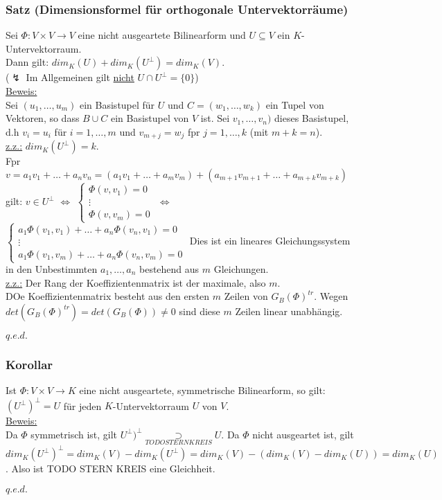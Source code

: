 \documentclass[a4paper]{article}
\newcommand{\ul}{\underline}
\renewcommand{\proof}{\ul{Beweis:}\\}
\renewcommand{\qed}{\begin{flushright}
\ul{\(q.e.d.\)}
\end{flushright}}
\begin{document}
\subsubsection{Satz (Dimensionsformel für orthogonale Untervektorräume)}
Sei \(\Phi:V\times V\rightarrow V\) eine nicht ausgeartete Bilinearform und \(U\subseteq V\) ein \(K\)-Untervektorraum.\\
Dann gilt: \(dim_K(U)+dim_K(U^\bot)=dim_K(V)\).\\
(\(\lightning\) Im Allgemeinen gilt \ul{nicht} \(U\cap U^\bot=\{0\}\))\\
\proof
Sei \((u_1,\dots, u_m)\) ein Basistupel für \(U\) und \(C=(w_1,\dots,w_k)\) ein Tupel von Vektoren, so dass \(B\cup C\) ein Basistupel von \(V\) ist. Sei \(v_1,\dots,v_n)\) dieses Basistupel, d.h \(v_i=u_i\) für \(i=1,\dots,m\) und \(v_{m+j}=w_j\) fpr \(j=1,\dots,k\) (mit \(m+k=n\)).\\
\ul{z.z.:} \(dim_K(U^\bot)=k\).\\
Fpr \(v=a_1v_1+\dots+a_nv_n=(a_1v_1+\dots+a_mv_m)+(a_{m+1}v_{m+1}+\dots+a_{m+k}v_{m+k})\) gilt: \(v\in U^\bot\) \(\Leftrightarrow\) \(\begin{cases}
	\Phi(v,v_1)=0\\
	\vdots\\
	\Phi(v,v_m)=0
	\end{cases}\) \(\Leftrightarrow\) \(\begin{cases}
	a_1\Phi(v_1,v_1)+\dots+a_n\Phi(v_n,v_1)=0\\
	\vdots\\
	a_1\Phi(v_1,v_m)+\dots+a_n\Phi(v_n,v_m)=0
	\end{cases}\)
	Dies ist ein lineares Gleichungssystem in den Unbestimmten \(a_1,\dots,a_n\) bestehend aus \(m\) Gleichungen.\\
	\ul{z.z.:} Der Rang der Koeffizientenmatrix ist der maximale, also \(m\).\\
	DOe Koeffizientenmatrix besteht aus den ersten \(m\) Zeilen von \(G_B(\Phi)^{tr}\). Wegen \(det(G_B(\Phi)^{tr})=det(G_B(\Phi))\neq 0\) sind diese \(m\) Zeilen linear unabhängig.
	\qed
\subsubsection{Korollar}
Ist \(\Phi:V\times V\rightarrow K\) eine nicht ausgeartete, symmetrische Bilinearform, so gilt: \((U^\bot)^\bot=U\) für jeden \(K\)-Untervektorraum \(U\) von \(V\).\\
\proof
Da \(\Phi\) symmetrisch ist, gilt \(U^\bot)^\bot\underset{TODO STERN KREIS}{\supset} U\). Da \(\Phi\) nicht ausgeartet ist, gilt \(dim_K(U^\bot)^\bot=dim_K(V)-dim_K(U^\bot)=dim_K(V)-(dim_K(V)-dim_K(U))=dim_K(U)\). Also ist TODO STERN KREIS eine Gleichheit.
\qed
\end{document}
